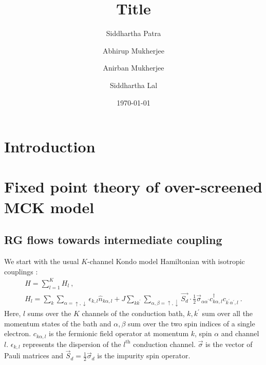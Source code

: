 \documentclass[reprint,prb,superscriptaddress]{revtex4-2}
\begin{document}
\title{Title}
\author{Siddhartha Patra}
\author{Abhirup Mukherjee}
\author{Anirban Mukherjee}
\author{Siddhartha Lal}
\date{\today}
\begin{abstract}
	\lipsum[1-2]
\end{abstract}
\maketitle
\tableofcontents
\section{Introduction}


\section{Fixed point theory of over-screened MCK model}

\subsection{RG flows towards intermediate coupling}
\label{rg_flow_section}
We start with the usual \(K\)-channel Kondo model Hamiltonian with isotropic couplings \cite{Noz_blandin_1980}:
\begin{gather}
	\label{mc_ham}
	H = \sum_{l=1}^K H_l~,\nonumber\\
	H_l = \sum_{k}\sum_{\alpha=\uparrow,\downarrow}\epsilon_{k,l} \hat n_{k\alpha,l} + J\sum_{kk^\prime} \sum_{\alpha,\beta= \uparrow,\downarrow}\vec{S_d}\cdot\frac{1}{2}\vec{\sigma}_{\alpha\alpha^\prime}c_{k\alpha,l}^\dagger c_{k^\prime\alpha^\prime, l}~.
\end{gather}
Here, \(l\) sums over the \(K\) channels of the conduction bath, \(k,k^\prime\) sum over all the momentum states of the bath and \(\alpha,\beta\) sum over the two spin indices of a single electron. \(c_{k\alpha,l}\) is the fermionic field operator at momentum \(k\), spin \(\alpha\) and channel \(l\). \(\epsilon_{k,l}\) represents the dispersion of the \(l^\text{th}\) conduction channel. \(\vec \sigma\) is the vector of Pauli matrices and \(\vec S_d = \frac{1}{2}\vec \sigma_d\) is the impurity spin operator.
\end{document}
